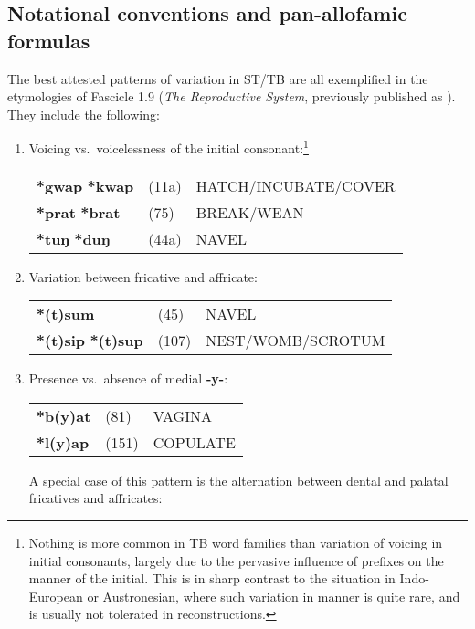 \subsection{Notational conventions and pan-allofamic formulas}

The best attested patterns of variation in ST/TB are all exemplified in the
etymologies of Fascicle 1.9 (\textit{The Reproductive System}, previously published
as \textit{}). They include the following:

\begin{enumerate}
\item %
Voicing vs.\ voicelessness of the initial consonant:\footnote{Nothing is
more common in TB word families than variation of voicing in initial consonants,
largely due to the pervasive influence of prefixes on the manner of the initial.
 This is in sharp contrast to the situation in Indo-European or Austronesian, where such
variation in manner is quite rare, and is usually not tolerated in
reconstructions.}\nopagebreak[4]

\begin{tabular}{lll}
\textbf{*gwap} \STEDTU{⪤} \textbf{*kwap}	&(11a)	&HATCH/INCUBATE/COVER\\
\textbf{*prat} \STEDTU{⪤} \textbf{*brat}	&(75)	&BREAK/WEAN\\
\textbf{*tuŋ} \STEDTU{⪤} \textbf{*duŋ}	&(44a)	&NAVEL\\
\end{tabular}

\item %
Variation between fricative and affricate:

\begin{tabular}{lll}
\textbf{*(t)sum}	&(45)		&NAVEL\\
\textbf{*(t)sip} \STEDTU{⪤} \textbf{*(t)sup} &(107)	&NEST/WOMB/SCROTUM\footnotemark\\
\end{tabular}

\item %
Presence vs.\ absence of medial \textbf{-y-}:

\begin{tabular}{lll}
\textbf{*b(y)at}	&(81)		&VAGINA\\
\textbf{*l(y)ap}	&(151)		&COPULATE\\
\end{tabular}

A special case of this pattern is the alternation between dental and palatal fricatives
and affricates:


\end{enumerate}
